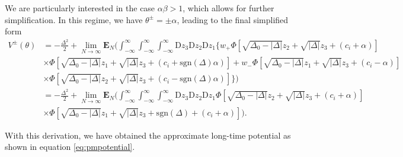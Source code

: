 \documentclass[reprint,amsmath,amssymb,aps]{revtex4-2}
\begin{document}
We are particularly interested in the case $\alpha\beta>1$, which allows for further simplification. In this regime, we have $\theta^\pm = \pm \alpha$, leading to the final simplified form
\begin{align*}
V^\pm(\theta)
    &=
    -\frac{\Delta^2}{2}+ 
    \lim_{N\to\infty} \mathbf{E}_{N} \Bigg(
    \int_{-\infty}^{\infty}\int_{-\infty}^{\infty}\int_{-\infty}^{\infty}
    \mathrm{D}z_3 \mathrm{D}z_2 \mathrm{D}z_1
    \Bigg\{
    w_+
    \Phi\left[ \sqrt{\Delta_0 - |\Delta|} z_2 + \sqrt{|\Delta|}z_3 + (c_i +\alpha)\right]
    \\
    &\times
    \Phi\left[ \sqrt{\Delta_0 - |\Delta|} z_1 + \sqrt{|\Delta|}z_3 + (c_i +\mathrm{sgn}(\Delta) \alpha )\right]
    +
    w_-
    \Phi\left[ \sqrt{\Delta_0 - |\Delta|} z_1 + \sqrt{|\Delta|}z_3 +(c_i- \alpha) \right]
    \\
    &\times
    \Phi\left[ \sqrt{\Delta_0 - |\Delta|} z_2 + \sqrt{|\Delta|}z_3 +(c_i- \mathrm{sgn}(\Delta) \alpha )\right]
    \Bigg\}\Bigg) \\
    &=
    -\frac{\Delta^2}{2}+ 
    \lim_{N\to\infty} \mathbf{E}_{N} \Bigg(
    \int_{-\infty}^{\infty}\int_{-\infty}^{\infty}\int_{-\infty}^{\infty}
    \mathrm{D}z_3 \mathrm{D}z_2 \mathrm{D}z_1
    \Phi\left[ \sqrt{\Delta_0 - |\Delta|} z_2 + \sqrt{|\Delta|}z_3 + (c_i + \alpha) \right]
    \\
    &\times
    \Phi\left[ \sqrt{\Delta_0 - |\Delta|} z_1 + \sqrt{|\Delta|}z_3 + \mathrm{sgn}(\Delta) +(c_i +\alpha )\right]
    \Bigg).
\end{align*}

With this derivation, we have obtained the approximate long-time potential as shown in equation \eqref{eq:pmpotential}.

\twocolumngrid



\end{document}
